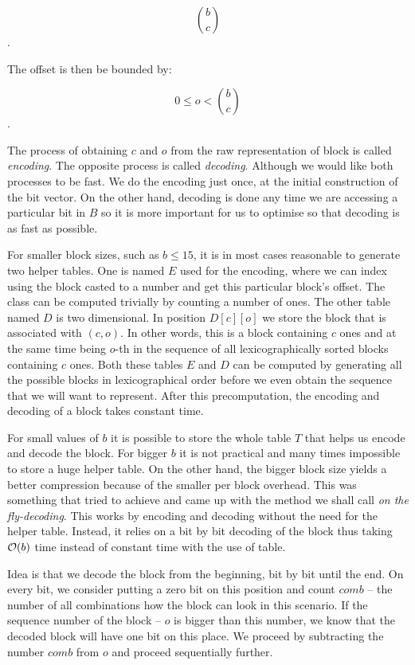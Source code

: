                 $${b\choose c}$$.

The offset is then be bounded by:

				$$0 \leq o < {b\choose c}$$.

The process of obtaining $c$ and $o$ from the raw representation of block is called
\textit{encoding}. The opposite process is called \textit{decoding}. Although we would
like both processes to be fast. We do the encoding just once, at the initial construction
of the bit vector. On the other hand, decoding is done any time we are accessing a particular
bit in $B$ so it is more important for us to optimise so that decoding is as fast as possible.

For smaller block sizes, such as $b\leq 15$, it is in most cases reasonable to
generate two helper tables. One is named $E$ used for the encoding, where we can
index using the block casted to a number and get this particular block's offset.
The class can be computed trivially by counting a number of ones. The other table
named $D$ is two dimensional. In position $D[c][o]$ we store the block that
is associated with $(c, o)$. In other words, this is a block containing $c$ ones
and at the same time being $o$-th in the sequence of all lexicographically sorted
blocks containing $c$ ones. Both these tables $E$ and $D$ can be computed
by generating all the possible blocks in lexicographical order before we even
obtain the sequence that we will want to represent. After this precomputation,
the encoding and decoding of a block takes constant time.

For small values of $b$ it is possible to store the whole table $T$ that helps us
encode and decode the block. For bigger $b$ it is not practical and many times
impossible to store a huge helper table. On the other hand, the bigger block size
yields a better compression because of the smaller per block overhead. This was
something that \cite{navarro2012fast} tried to achieve and came up with the method
we shall call \textit{on the fly-decoding}. This works by encoding and decoding without
the need for the helper table. Instead, it relies on a bit by bit decoding of the block
thus taking $\mathcal{O}(b)$ time instead of constant time with the use of table.

Idea is that we decode the block from the beginning, bit by bit until the end. On every bit,
we consider putting a zero bit on this position and count $comb$ -- the number of all
combinations how the block can look in this scenario. If the sequence number of the block --
$o$ is bigger than this number, we know that the decoded block will have one bit on this place.
We proceed by subtracting the number $comb$ from $o$ and proceed sequentially further.

